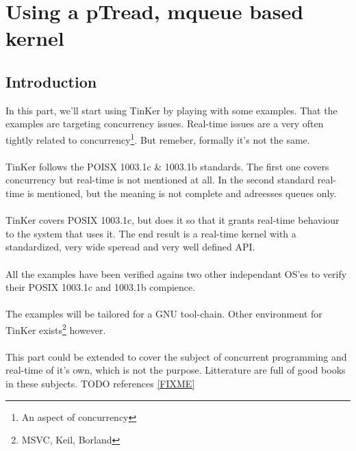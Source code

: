 
\part{Using a pTread, mqueue based kernel}
\chapter{Introduction}
In this part, we'll start using TinKer by playing with some examples. That the examples are targeting concurrency issues. Real-time issues are a very often tightly related to concurrency\footnote{An aspect of concurrency}. But remeber, formally it's not the same.
\\\\
TinKer follows the POISX 1003.1c \& 1003.1b standards. The first one covers concurrency but real-time is not mentioned at all. In the second standard real-time is mentioned, but the meaning is not complete and adreesses queues only.
\\\\
TinKer covers POSIX 1003.1c, but does it so that it grants real-time behaviour to the system that uses it. The end result is a real-time kernel with a standardized, very wide speread and very well defined API.
\\\\
All the examples have been verified agains two other independant OS'es to verify their POSIX 1003.1c and 1003.1b compience. 
\\\\
The examples will be tailored for a GNU tool-chain. Other environment for TinKer exists\footnote{MSVC, Keil, Borland} however.
\\\\
This part could be extended to cover the subject of concurrent programming and real-time of it's own, which is not the purpose. Litterature are full of good books in these subjects. TODO references \ref{FIXME}

